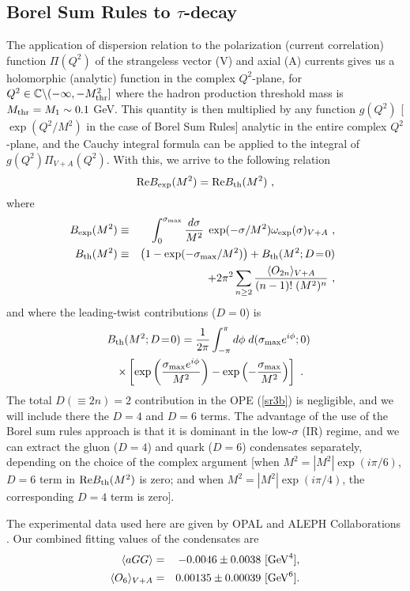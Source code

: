 \documentclass[3p,times,twocolumn]{elsarticle}
\def\be{\begin{equation}}
\def\ee{\end{equation}}
\def\bea{\begin{eqnarray}}
\def\eea{\end{eqnarray}}
\begin{document}
\subsection{Borel Sum Rules to $\tau$-decay}

The application of dispersion relation to the polarization (current correlation) function $\Pi(Q^2)$ of the strangeless vector (V) and axial (A) currents gives us a holomorphic (analytic) function in the complex $Q^2$-plane, for $Q^2 \in \mathbb{C} \backslash (-\infty, -M_{\rm thr}^2]$ where the hadron production threshold mass is $M_{\rm thr}=M_1 \sim 0.1$ GeV. This quantity is then multiplied by any function $g(Q^2)$ [$\exp(Q^2/M^2)$ in the case of Borel Sum Rules] analytic in the entire complex $Q^2$-plane, 
and the Cauchy integral formula can be applied to the integral of $g(Q^2) \Pi_{V+A}(Q^2)$. With this, we arrive to the following relation
\be
{\rm Re} B_{\rm exp}(M^2) =  {\rm Re} B_{\rm th}(M^2) \ ,
\label{sr3o0}
\ee
where
\bea
\!\!\!B_{\rm exp}(M^2) &\equiv& \int_0^{\sigma_{\rm max}} 
\frac{d \sigma}{M^2} \; \exp( - \sigma/M^2) \omega_{\rm exp}(\sigma)_{V+A} \ ,
\label{sr3a}
\nonumber\\
\!B_{\rm th}(M^2) &\equiv&  \left( 1 - \exp(-\sigma_{\rm max}/M^2) \right)
+ B_{\rm th}(M^2;D\!=\!0)
\nonumber\\
&&+ 2 \pi^2 \sum_{n \geq 2}
 \frac{ \langle O_{2n} \rangle_{V+A}}{ (n-1)! \; (M^2)^n} \ ,
\label{sr3b}
\eea
and where the leading-twist contributions ($D=0$) is
\bea
\lefteqn{B_{\rm th}(M^2;D\!=\!0)=\frac{1}{2 \pi}\int_{-\pi}^{\pi}
d \phi \; d(\sigma_{\rm max} e^{i \phi};0) }
\nonumber\\
&&\times\left[ 
\exp \left( \frac{\sigma_{\rm max} e^{i \phi}}{M^2} \right) -
\exp \left( - \frac{\sigma_{\rm max}}{M^2} \right) \right] \ .
\label{BD0}
\eea
The total $D (\equiv 2 n) =2$ contribution in the OPE (\ref{sr3b}) is negligible, and we will include there the $D=4$ and $D=6$ terms. The advantage of the use of the Borel sum rules approach is that it is dominant in the low-$\sigma$ (IR) regime, and we can extract the gluon ($D=4$) and quark ($D=6$) condensates separately, depending on the choice of the complex argument [when $M^2=|M^2| \exp(i \pi/6)$, $D=6$ term in ${\rm Re} B_{\rm th}(M^2)$ is zero; and when  $M^2=|M^2| \exp(i \pi/4)$, the corresponding $D=4$ term is zero]. 

The experimental data used here are given by OPAL  \cite{OPAL} and ALEPH Collaborations \cite{ALEPH2,ALEPHfin}. Our combined fitting values of the condensates are \cite{3danQCD2}
\bea
\langle a GG \rangle&=&-0.0046\pm 0.0038\ [{\rm GeV}^4] ,
\label{aGGOPAL}
\\
\langle O_6 \rangle_{V+A}&=&0.00135\pm0.00039\ [{\rm GeV}^6].
\label{O6OPAL}
\eea
\end{document}
